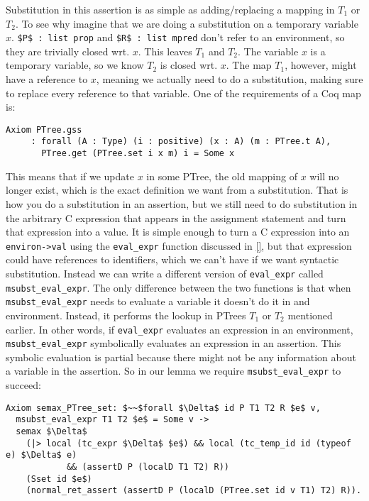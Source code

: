\documentclass{puthesis}
\begin{document}
Substitution in this assertion is 
as simple as adding/replacing a mapping in $T_1$ or $T_2$. To see why imagine
that we are doing a substitution on a temporary variable $x$. 
\lstinline|$P$ : list prop| and \lstinline|$R$ : list mpred| don't
refer to an environment, so they are trivially closed wrt.
$x$. This leaves $T_1$ and $T_2$. The variable $x$
is a temporary variable, so we know $T_2$ is closed wrt. $x$.
The map $T_1$, however, might have a reference to $x$, meaning
we actually need to do a substitution, making sure to replace every reference
to that variable. One of the requirements of a Coq map is:

\begin{lstlisting}
Axiom PTree.gss
     : forall (A : Type) (i : positive) (x : A) (m : PTree.t A),
       PTree.get (PTree.set i x m) i = Some x
\end{lstlisting}

This means that if we update $x$ in some PTree, the old
mapping of $x$ will no longer exist, which is the exact
definition we want from a substitution. That is how you do a substitution
in an assertion, but we still need to do substitution in the arbitrary
C expression that appears in the assignment statement and turn that expression
into a value. It is simple enough to turn a C expression
into an \lstinline|environ->val| using the \lstinline|eval_expr| function
discussed in \ref{}, but that expression could have references to identifiers,
which we can't have if we want syntactic substitution. Instead we can write
a different version of \lstinline|eval_expr| called 
\lstinline|msubst_eval_expr|. The only difference between the two functions
is that when \lstinline|msubst_eval_expr| needs to evaluate a variable it
doesn't do it in and environment. Instead, it performs the lookup in 
PTrees $T_1$ or $T_2$ mentioned earlier. In other words, if
\lstinline|eval_expr| evaluates an expression in an environment, 
\lstinline|msubst_eval_expr| symbolically evaluates an expression
in an assertion. This symbolic evaluation is partial because there might
not be any information about a variable in the assertion. So in our
lemma we require \lstinline|msubst_eval_expr| to succeed:

\begin{lstlisting}
Axiom semax_PTree_set: $~~$forall $\Delta$ id P T1 T2 R $e$ v,
  msubst_eval_expr T1 T2 $e$ = Some v ->
  semax $\Delta$
    (|> local (tc_expr $\Delta$ $e$) && local (tc_temp_id id (typeof e) $\Delta$ e) 
            && (assertD P (localD T1 T2) R))
    (Sset id $e$)
    (normal_ret_assert (assertD P (localD (PTree.set id v T1) T2) R)).
\end{lstlisting}
\end{document}
